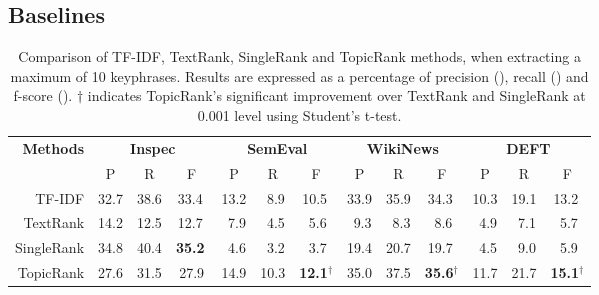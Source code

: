   \subsection{Baselines}
  \label{subsec:baselines}
    \begin{table}
      \centering
      \begin{tabular}{@{ }rcccccccccccc@{ }}
        \toprule
        \multirow{2}{*}[-2pt]{\textbf{Methods}} & \multicolumn{3}{c}{\textbf{Inspec}} & \multicolumn{3}{c}{\textbf{SemEval}} & \multicolumn{3}{c}{\textbf{WikiNews}} & \multicolumn{3}{c}{\textbf{DEFT}}\\
        \cmidrule(lr){2-4}\cmidrule(lr){5-7}\cmidrule(lr){8-10}\cmidrule(l){11-13}
        & P & R & F & P & R & F & P & R & F & P & R & F\\
        \midrule
        TF-IDF & 32.7 & 38.6 & 33.4$^{~}$ & 13.2 & $~~$8.9 & 10.5$^{~}$ & 33.9 & 35.9 & 34.3$^{~}$ & 10.3 & 19.1 & 13.2$^{~}$\\
        TextRank & 14.2 & 12.5 & 12.7$^{~}$ & $~~$7.9 & $~~$4.5 & $~~$5.6$^{~}$ & $~~$9.3 & $~~$8.3 & $~~$8.6$^{~}$ & $~~$4.9 & $~~$7.1 & $~~$5.7$^{~}$\\
        SingleRank & 34.8 & 40.4 & \textbf{35.2}$^{~}$ & $~~$4.6 & $~~$3.2 & $~~$3.7$^{~}$ & 19.4 & 20.7 & 19.7$^{~}$ & $~~$4.5 & $~~$9.0 & $~~$5.9$^{~}$\\
        TopicRank & 27.6 & 31.5 & 27.9  & 14.9 & 10.3 & \textbf{12.1}$^\dagger$ & 35.0 & 37.5 & \textbf{35.6}$^\dagger$ & 11.7 & 21.7 & \textbf{15.1}$^\dagger$\\
        \bottomrule
      \end{tabular}
      \caption{Comparison of TF-IDF, TextRank, SingleRank and TopicRank methods,
               when extracting a maximum of 10 keyphrases. Results are expressed
               as a percentage of precision (), recall () and
               f-score (). $\dagger$ indicates TopicRank's significant
               improvement over TextRank and SingleRank at 0.001 level using
               Student's t-test. \label{tab:results}}
    \end{table}

